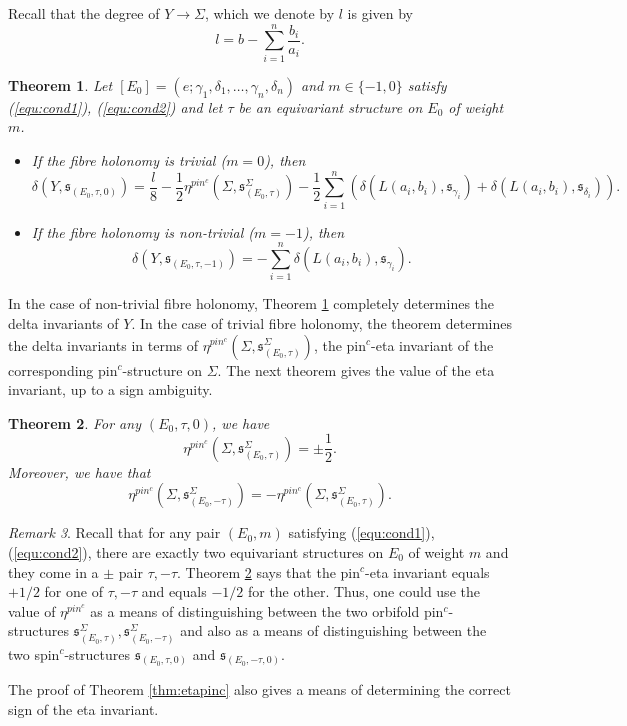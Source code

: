\documentclass{amsart}
\newtheorem{theorem}{Theorem}[section]
\theoremstyle{definition}
\theoremstyle{remark}
\newtheorem{remark}[theorem]{Remark}
\numberwithin{equation}{section}
\begin{document}
Recall that the degree of $Y \to \Sigma$, which we denote by $l$ is given by
\[
l = b - \sum_{i=1}^n \frac{b_i}{a_i}.
\]

\begin{theorem}\label{thm:dY}
Let $[E_0] = (e ; \gamma_1 , \delta_1 , \dots , \gamma_n , \delta_n)$ and $m \in \{-1,0\}$ satisfy (\ref{equ:cond1}), (\ref{equ:cond2}) and let $\tau$ be an equivariant structure on $E_0$ of weight $m$.
\begin{itemize}
\item[(1)]{If the fibre holonomy is trivial ($m=0$), then
\[
\delta(Y,\mathfrak{s}_{(E_0 , \tau , 0)}) =  \frac{l}{8} - \frac{1}{2} \eta^{pin^c}(\Sigma , \mathfrak{s}_{(E_0 , \tau)}^{\Sigma}) -\frac{1}{2} \sum_{i=1}^n \left( \delta(L(a_i,b_i) , \mathfrak{s}_{\gamma_i}) + \delta( L(a_i,b_i) , \mathfrak{s}_{\delta_i}) \right).
\]
}
\item[(2)]{If the fibre holonomy is non-trivial ($m=-1$), then
\[
\delta(Y , \mathfrak{s}_{(E_0 , \tau , -1)}) = -\sum_{i=1}^{n} \delta( L(a_i , b_i ) , \mathfrak{s}_{\gamma_i}).
\]
}
\end{itemize}

\end{theorem}

In the case of non-trivial fibre holonomy, Theorem \ref{thm:dY} completely determines the delta invariants of $Y$. In the case of trivial fibre holonomy, the theorem determines the delta invariants in terms of $\eta^{pin^c}(\Sigma , \mathfrak{s}_{(E_0 , \tau)}^{\Sigma})$, the pin$^c$-eta invariant of the corresponding pin$^c$-structure on $\Sigma$. The next theorem gives the value of the eta invariant, up to a sign ambiguity.

\begin{theorem}\label{thm:epc}
For any $(E_0 , \tau , 0)$, we have
\[
\eta^{pin^c}(\Sigma , \mathfrak{s}_{(E_0 , \tau)}^{\Sigma}) = \pm \frac{1}{2}.
\]
Moreover, we have that 
\[
\eta^{pin^c}(\Sigma , \mathfrak{s}_{(E_0 , -\tau)}^{\Sigma}) = -\eta^{pin^c}(\Sigma , \mathfrak{s}_{(E_0 , \tau)}^{\Sigma}).
\]
\end{theorem}

\begin{remark}
Recall that for any pair $(E_0 , m)$ satisfying (\ref{equ:cond1}), (\ref{equ:cond2}), there are exactly two equivariant structures on $E_0$ of weight $m$ and they come in a $\pm$ pair $\tau , -\tau$. Theorem \ref{thm:epc} says that the pin$^c$-eta invariant equals $+1/2$ for one of $\tau, -\tau$ and equals $-1/2$ for the other. Thus, one could use the value of $\eta^{pin^c}$ as a means of distinguishing between the two orbifold pin$^c$-structures $\mathfrak{s}^\Sigma_{(E_0 , \tau)}, \mathfrak{s}^\Sigma_{(E_0 , -\tau)}$ and also as a means of distinguishing between the two spin$^c$-structures $\mathfrak{s}_{(E_0 , \tau , 0)}$ and $\mathfrak{s}_{(E_0 , -\tau , 0)}$.

The proof of Theorem \ref{thm:etapinc} also gives a means of determining the correct sign of the eta invariant.
\end{remark}
\end{document}
